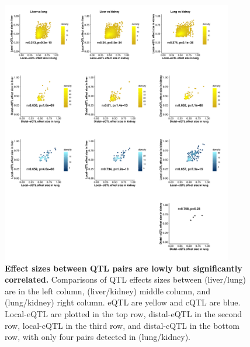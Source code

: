 \documentclass[9pt,twocolumn,twoside]{gsajnl}
\begin{document}
\begin{figure}[hp]
\renewcommand{\familydefault}{\sfdefault}\normalfont
\centering
\includegraphics[width=0.9\textwidth, trim={0in 0in 0in 0in}, clip]{figs/effect_size_by_effect_size.pdf}
\caption{\textbf{Effect sizes between QTL pairs are lowly but significantly correlated.} Comparisons of QTL effects sizes between (liver/lung) are in the left column, (liver/kidney) middle column, and (lung/kidney) right column. eQTL are yellow and cQTL are blue. Local-eQTL are plotted in the top row, distal-eQTL in the second row, local-cQTL in the third row, and distal-cQTL in the bottom row, with only four pairs detected in (lung/kidney). 
\label{fig:qtl_effect_size_comparison}}
\end{figure}
\end{document}
